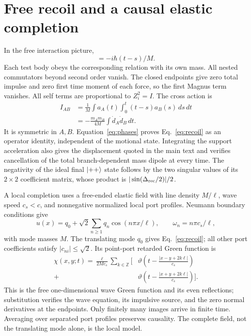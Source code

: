 \section{Free recoil and a causal elastic completion}\label{app:free}
In the free interaction picture,
\begin{equation}
[X(t),X(s)]=-i\hbar(t-s)/M.
\label{eq:freecomm}
\end{equation}
Each test body obeys the corresponding relation with its own mass. All nested commutators beyond second order vanish. The closed endpoints give zero total impulse and zero first time moment of each force, so the first Magnus term vanishes. All self terms are proportional to $Z_i^2=I$. The cross action is
\begin{equation}
\begin{split}
I_{AB}&=\frac1M\int a_A(t)\int_0^t(t-s)a_B(s)\,ds\,dt\\
&=-\frac{m_Am_B}{4M}\int\dot d_A\dot d_B\,dt.
\end{split}
\label{eq:freeaction}
\end{equation}
It is symmetric in $A,B$. Equation~\eqref{eq:phases} proves Eq.~\eqref{eq:recoil} as an operator identity, independent of the motional state. Integrating the support acceleration also gives the displacement quoted in the main text and verifies cancellation of the total branch-dependent mass dipole at every time. The negativity of the ideal final $\lvert++\rangle$ state follows by the two singular values of its $2\times2$ coefficient matrix, whose product is $|\sin(\Delta_{\rm rec}/2)|/2$.

A local completion uses a free-ended elastic field with line density $M/\ell$, wave speed $c_s<c$, and nonnegative normalized local port profiles. Neumann boundary conditions give
\begin{equation}
u(x)=q_0+\sqrt2\sum_{n\ge1}q_n\cos(n\pi x/\ell),\qquad
\omega_n=n\pi c_s/\ell,
\label{eq:Neumann}
\end{equation}
with mode masses $M$. The translating mode $q_0$ gives Eq.~\eqref{eq:recoil}; all other port coefficients satisfy $|c_{ni}|\le\sqrt2$. Its point-port retarded Green function is
\begin{equation}
\begin{split}
\chi(x,y;t)=\frac{\ell}{2Mc_s}\sum_{k\in\mathbb Z}\bigg[&\vartheta\left(t-\frac{|x-y+2k\ell|}{c_s}\right)\\
+&\vartheta\left(t-\frac{|x+y+2k\ell|}{c_s}\right)\bigg].
\end{split}
\label{eq:NeumannGreen}
\end{equation}
This is the free one-dimensional wave Green function and its even reflections; substitution verifies the wave equation, its impulsive source, and the zero normal derivatives at the endpoints. Only finitely many images arrive in finite time. Averaging over separated port profiles preserves causality. The complete field, not the translating mode alone, is the local model.


